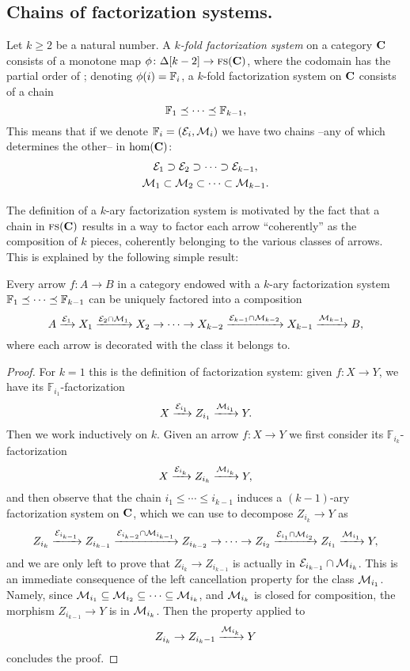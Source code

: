 \subsection{Chains of factorization systems.}
\begin{definition}\label{mult.fs}
Let $k \ge 2$ be a natural number. A \emph{$k$\hyp{}fold factorization system} on a category $\mathbf{C}$ consists of a monotone map $\phi\colon \Delta[k-2]\to \textsc{fs}(\mathbf{C})$, where the codomain has the partial order of \adef {}; denoting $\phi(i)=\mathbb{F}_i$, a $k$\hyp{}fold factorization system on $\mathbf{C}$ consists of a chain
\[
\mathbb{F}_1 \preceq \dots \preceq \mathbb{F}_{k-1},
\]
This means that if we denote $\mathbb{F}_i = (\mathcal{E}_i, \mathcal{M}_i)$ we have two chains --any of which determines the other-- in $\text{hom}(\mathbf{C})$:
\begin{gather*}
\mathcal{E}_1\supset \mathcal{E}_2 \supset\dots\supset \mathcal{E}_{k-1},\\
\mathcal{M}_1\subset \mathcal{M}_2 \subset\dots\subset \mathcal{M}_{k-1}.
\end{gather*}
\end{definition}
The definition of a $k$\hyp{}ary factorization system is motivated by the fact that a chain in $\textsc{fs}(\mathbf{C})$ results in a way to factor each arrow ``coherently'' as the composition of $k$ pieces, coherently belonging to the various classes of arrows. This is explained by the following simple result:
\begin{lemma}\label{multiple.fact}
Every arrow $f\colon A\to B$ in a category endowed with a $k$\hyp{}ary factorization system $\mathbb{F}_1\preceq\dots\preceq \mathbb{F}_{k-1}$ can be uniquely factored into a composition
\[
A \xrightarrow{\mathcal{E}_1} X_1 \xrightarrow{\mathcal{E}_2\cap \mathcal{M}_1} X_2\to\dots\to X_{k-2} \xrightarrow{\mathcal{E}_{k-1}\cap \mathcal{M}_{k-2}} X_{k-1} \xrightarrow{\mathcal{M}_{k-1}} B,
\]
where each arrow is decorated with the class it belongs to.
\end{lemma}
\begin{proof}
For $k=1$ this is the definition of factorization system: given $f\colon X\to Y$, we have its $\mathbb{F}_{i_1}$\hyp{}factorization
\[
X \xrightarrow{\mathcal{E}_{i_1}} Z_{i_1}  \xrightarrow{\mathcal{M}_{i_{1}}} Y.
\]
Then we work inductively on $k$. Given an arrow $f\colon X\to Y$ we first consider its $\mathbb{F}_{i_k}$\hyp{}factorization
\[
X \xrightarrow{\mathcal{E}_{i_k}} Z_{i_k}  \xrightarrow{\mathcal{M}_{i_{k}}} Y,
\]
and then observe that the chain $i_1\leq\cdots\leq i_{k-1}$ induces a $(k-1)$\hyp{}ary factorization system on $\mathbf{C}$, which we can use to decompose $Z_{i_k}\to Y$ as
\[
Z_{i_k} \xrightarrow{\mathcal{E}_{i_{k-1}}} Z_{i_{k-1}} \xrightarrow{\mathcal{E}_{i_{k-2}}\cap \mathcal{M}_{i_{k-1}}} Z_{i_{k-2}}\to\dots\to Z_{i_{2}}\xrightarrow{\mathcal{E}_{i_{1}}\cap \mathcal{M}_{i_{2}}} Z_{i_{1}} \xrightarrow{\mathcal{M}_{i_{1}}} Y,
\]
and we are only left to prove that $Z_{i_{k}} \to Z_{i_{k-1}}$ is actually in $\mathcal{E}_{i_{k-1}}\cap \mathcal{M}_{i_{k}}$. This is an immediate consequence of the left cancellation property for the class $\mathcal{M}_{i_{1}}$. Namely, since $\mathcal{M}_{i_1}\subseteq \mathcal{M}_{i_2} \subseteq\dots\subseteq \mathcal{M}_{i_k}$, and $ \mathcal{M}_{i_k}$ is closed for composition, the morphism $Z_{i_{k-1}}\to Y$ is in $\mathcal{M}_{i_k}$. Then the  property applied to 
\[
Z_{i_{k}}\to Z_{i_k-1}\xrightarrow{\mathcal{M}_{i_k}} Y
\]
concludes the proof.
\end{proof}
